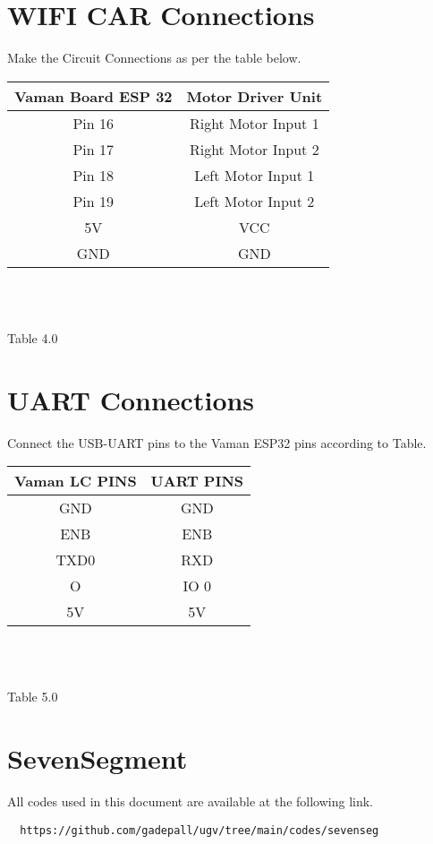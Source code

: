 \documentclass[journal,15pt,twocolumn,tikz, border=5mm]{IEEEtran}
\begin{document}
\section{WIFI CAR Connections}
\raggedright
Make the Circuit Connections as per the table below.\\
\vspace{0.25cm}
\centering
\begin{tabular}{|c|c|}
\hline
Vaman Board ESP 32 & Motor Driver Unit\\
\hline
Pin 16 & Right Motor Input 1\\
\hline
Pin 17 & Right Motor Input 2\\
\hline
Pin 18 & Left Motor Input 1\\
\hline
Pin 19 & Left Motor Input 2\\
\hline
5V & VCC\\
\hline
GND & GND\\
\hline
\end{tabular}\\
\
\centerline{Table 4.0}

\section{UART Connections}
\raggedright
Connect the USB-UART pins to the Vaman ESP32 pins according to Table.\\
\vspace{0.25cm}
\centering
\begin{tabular}{|c|c|}
\hline
Vaman LC PINS & UART PINS\\
\hline
GND & GND\\
\hline
ENB & ENB\\
\hline
TXD0 & RXD\\
\hline
O & IO 0\\
\hline
5V & 5V\\
\hline
\end{tabular}\\
\
\centerline{Table 5.0}

\section{SevenSegment}
All codes used in this document are available at the following link.

\begin{lstlisting}
  https://github.com/gadepall/ugv/tree/main/codes/sevenseg
\end{lstlisting}
\end{document}
